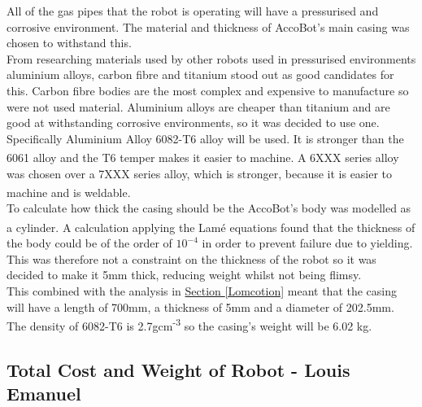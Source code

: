 \documentclass[11pt]{article}		%
\newcommand{\supercite}[1]{\textsuperscript{\cite{#1}}}		%
\newcommand{\sectref}[1]{\hyperref[#1]{Section \ref*{#1}}}     %
\begin{document}
			All of the gas pipes that the robot is operating will have a pressurised and corrosive environment. %
			The material and thickness of AccoBot's main casing was chosen to withstand this.%
			\\
            \hspace*{2ex}From researching materials used by other robots used in pressurised environments aluminium alloys, carbon fibre and titanium stood out as good candidates for this. Carbon fibre bodies are the most complex and expensive to manufacture so were not used material. Aluminium alloys are cheaper than titanium and are good at withstanding corrosive environments, so it was decided to use one.
		    Specifically Aluminium Alloy 6082-T6 alloy will be used. It is stronger than the 6061 alloy and the T6 temper makes it easier to machine\supercite{Aluminium_Alloys}. A 6XXX series alloy was chosen over a 7XXX series alloy, which is stronger, because it is easier to machine and is weldable\supercite{Aluminium_Alloys_differences}.
		    \\
            \hspace*{2ex}To calculate how thick the casing should be the AccoBot's body was modelled as a cylinder. A calculation applying the Lamé equations\supercite{lame} found that the thickness of the body could be of the order of $10^{-4}$ in order to prevent failure due to yielding. This was therefore not a constraint on the thickness of the robot so it was decided to make it 5mm thick, reducing weight whilst not being flimsy.
		   \\
            \hspace*{2ex}This combined with the analysis in \sectref{Lomcotion} meant that the casing will have a length of 700mm, a thickness of 5mm and a diameter of 202.5mm. The density of 6082-T6 is 2.7gcm\textsuperscript{-3} so the casing's weight will be 6.02 kg.
		   
   		\subsection[Total Cost and Weight of Robot]{Total Cost and Weight of Robot - Louis Emanuel}
\end{document}
